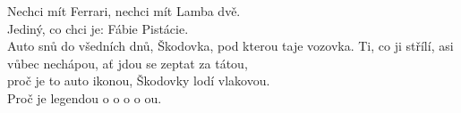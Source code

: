 \cho{}
Nechci mít Ferrari,
nechci mít Lamba dvě.\\
Jediný, co chci je:
Fábie Pistácie.\\
Auto snů do všedních dnů,
Škodovka, pod kterou taje vozovka.
\ve{}
Ti, co ji střílí, asi vůbec nechápou,
ať jdou se zeptat za tátou,\\
proč je to auto ikonou,
Škodovky lodí vlakovou.\\
Proč je legendou o o o o ou.
\cho{}
\cho{}
\esong{}